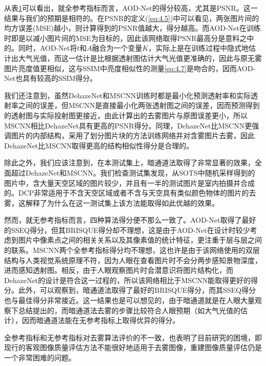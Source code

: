 \documentclass[a4paper, 12pt, oneside]{report}
\begin{document}
{\begin{table}[htbp]
\begin{tabular}{c|c|c|c|c}
    \end{tabular}%
  \label{tab:4.1}%
\end{table}%
从表\ref{tab:4.1}可以看出，就全参考指标而言，AOD-Net的得分较高，尤其是PSNR。这一结果与我们的预期是相符的。在PSNR的定义(\ref{eq:4.5})中可以看见，两张图片间的均方误差(MSE)越小，则计算得到的PSNR值越大，得分越高。而AOD-Net在训练时即是以减小图片间的MSE为目标的，因此该网络取得PSNR最高分是意料之中的。同时，AOD-Net将$t$和$A$融合为一个变量$K$，实际上是在训练过程中隐式地估计出大气光值，而这一估计是比根据透射图估计大气光值更准确的，因此与原无雾图片亮度值更相似，这与SSIM中亮度相似性的测量\ref{eq:4.7}是吻合的，因而AOD-Net也具有较高的SSIM得分。

我们还注意到，虽然DehazeNet和MSCNN训练时都是最小化预测透射率和实际透射率之间的误差，但MSCNN是直接最小化两张透射图之间的误差，因而预测得到的透射图与实际投射图更接近，由此计算出的去雾图片与原图误差更小，所以MSCNN相比DehazeNet具有更高的PSNR得分。同理，DehazeNet比MSCNN更强调图片的内部结构，采用了划分图片块的方法训练网络并对含雾图片去雾，因此DehazeNet比MSCNN取得更高的结构相似性得分是合理的。

除此之外，我们应该注意到，在本测试集上，暗通道法取得了非常显著的效果，全面超过DehazeNet和MSCNN。我们检查测试集发现，从SOTS中随机采样得到的图片中，含大量天空区域的图片较少，并且有一半的测试图片是室内拍摄并合成的。DCP非常适用于不含天空区域或者不含与天空具有类似颜色物体的图片的去雾，这解释了为什么在这一测试集上该方法能取得如此优越的效果。

然而，就无参考指标而言，四种算法得分便不那么一致了。AOD-Net取得了最好的SSEQ得分，但其BRISQUE得分却不理想，这是由于AOD-Net在设计时较少考虑到图片中像素点之间的相关关系以及其像素值的统计特征，更注重于层与层之间的联系。MSCNN两个全参考指标得分均不理想，这也许是由于该网络使用的双层结构与人类视觉系统原理不符，因为人眼在查看图片时不会分两步感知景物深度，进而感知透射图。相反，由于人眼观察图片时会潜意识将图片结构化，而DehazeNet的设计是符合这一过程的，所以该网络相比于MSCNN能取得更好的得分。此外，可以观察到，暗通道法取得了最好的BRISQUE得分，而其SSEQ得分也与最佳得分非常接近。这一结果也是可以想见的，由于暗通道就是在人眼大量观察下总结提出的，而暗通道法去雾的步骤比较符合人眼预期（如大气光值的估计），因而暗通道法能在无参考指标上取得优异的得分。

全参考指标和无参考指标对去雾算法评价的不一致，也表明了目前研究的困境，即现行的客观图像质量评估方法不能很好地适用于去雾图像，重建图像质量评估仍是一个非常困难的问题。

}
\end{document}

